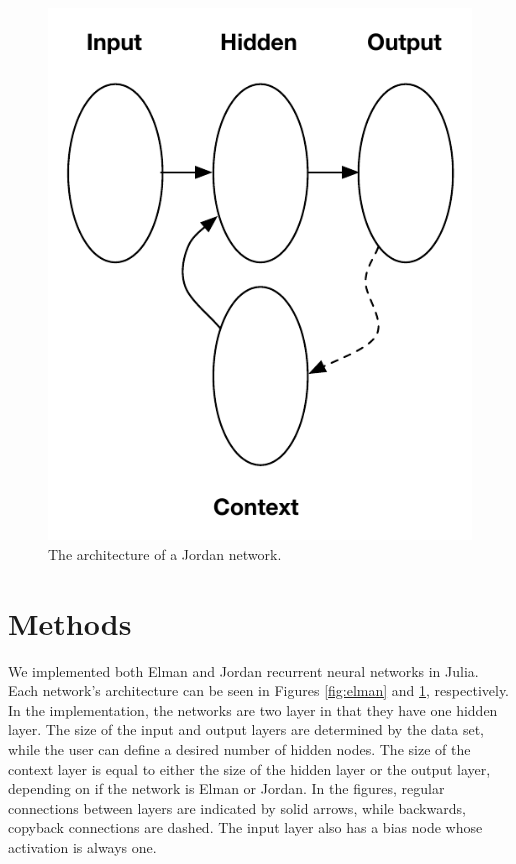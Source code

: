 \documentclass{acm_proc_article-sp}
\begin{document}
\begin{figure}
\begin{center}
\includegraphics[scale=.8]{Images/jordan.pdf}
\caption{The architecture of a Jordan network.}
\label{fig:jordan}
\end{center}
\end{figure}

\section{Methods}
We implemented both Elman and Jordan recurrent neural networks in Julia. 
Each network's architecture can be seen in Figures \ref{fig:elman} and \ref{fig:jordan}, respectively. 
In the implementation, the networks are two layer in that they have one hidden layer. 
The size of the input and output layers are determined by the data set, while the user can define a desired number of hidden nodes. 
The size of the context layer is equal to either the size of the hidden layer or the output layer, depending on if the network is Elman or Jordan. 
In the figures, regular connections between layers are indicated by solid arrows, while backwards, copyback connections are dashed. 
The input layer also has a bias node whose activation is always one. 
\end{document}
